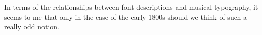 \documentclass[10pt]{newlfm}
\begin{document}
\begin{newlfm}
  In terms of the relationships between font
  descriptions and musical typography, it seems to
  me that only in the case of the early 1800s
  should we think of such a really odd notion.

\end{newlfm}
\end{document}
